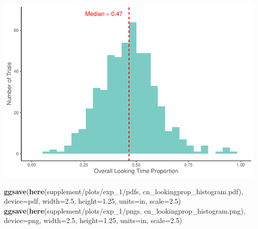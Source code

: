 \documentclass[
  doc,floatsintext]{apa6}
\newenvironment{Shaded}{\begin{snugshade}}{\end{snugshade}}
\newcommand{\AttributeTok}[1]{\textcolor[rgb]{0.13,0.29,0.53}{#1}}
\newcommand{\FloatTok}[1]{\textcolor[rgb]{0.00,0.00,0.81}{#1}}
\newcommand{\FunctionTok}[1]{\textcolor[rgb]{0.13,0.29,0.53}{\textbf{#1}}}
\newcommand{\NormalTok}[1]{#1}
\newcommand{\StringTok}[1]{\textcolor[rgb]{0.31,0.60,0.02}{#1}}
\begin{document}
\includegraphics{revised_ms_analyses_files/figure-latex/r2-cn-durs-lookingprop-1.pdf}

\begin{Shaded}
\begin{Highlighting}[]
\FunctionTok{ggsave}\NormalTok{(}\FunctionTok{here}\NormalTok{(}\StringTok{\textquotesingle{}supplement/plots/exp\_1/pdfs\textquotesingle{}}\NormalTok{, }\StringTok{\textquotesingle{}cn\_lookingprop\_histogram.pdf\textquotesingle{}}\NormalTok{), }
       \AttributeTok{device=}\StringTok{\textquotesingle{}pdf\textquotesingle{}}\NormalTok{, }\AttributeTok{width=}\FloatTok{2.5}\NormalTok{, }\AttributeTok{height=}\FloatTok{1.25}\NormalTok{, }\AttributeTok{units=}\StringTok{\textquotesingle{}in\textquotesingle{}}\NormalTok{, }\AttributeTok{scale=}\FloatTok{2.5}\NormalTok{)}
\FunctionTok{ggsave}\NormalTok{(}\FunctionTok{here}\NormalTok{(}\StringTok{\textquotesingle{}supplement/plots/exp\_1/pngs\textquotesingle{}}\NormalTok{, }\StringTok{\textquotesingle{}cn\_lookingprop\_histogram.png\textquotesingle{}}\NormalTok{), }
       \AttributeTok{device=}\StringTok{\textquotesingle{}png\textquotesingle{}}\NormalTok{, }\AttributeTok{width=}\FloatTok{2.5}\NormalTok{, }\AttributeTok{height=}\FloatTok{1.25}\NormalTok{, }\AttributeTok{units=}\StringTok{\textquotesingle{}in\textquotesingle{}}\NormalTok{, }\AttributeTok{scale=}\FloatTok{2.5}\NormalTok{)}
\end{Highlighting}
\end{Shaded}
\end{document}
